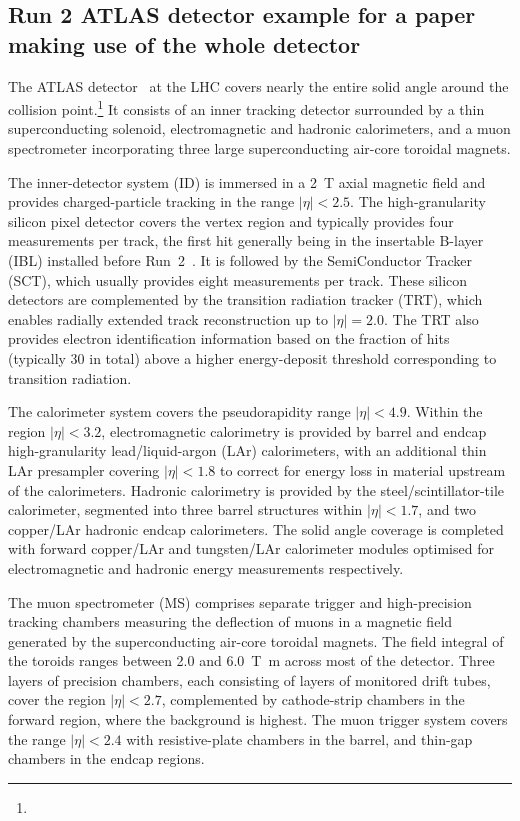 \subsection{Run 2 ATLAS detector example for a paper making use of the whole detector}
\label{sec:atlas2b}

The ATLAS detector~\cite{PERF-2007-01} at the LHC covers nearly the entire solid angle around the collision point.\footnote{\AtlasCoordFootnote}
It consists of an inner tracking detector surrounded by a thin superconducting solenoid, electromagnetic and hadronic calorimeters,
and a muon spectrometer incorporating three large superconducting air-core toroidal magnets.

The inner-detector system (ID) is immersed in a \qty{2}{\tesla} axial magnetic field 
and provides charged-particle tracking in the range \(|\eta| < 2.5\).
The high-granularity silicon pixel detector covers the vertex region and typically provides four measurements per track, 
the first hit generally being in the insertable B-layer (IBL) installed before Run~2~\cite{ATLAS-TDR-19,PIX-2018-001}.
It is followed by the SemiConductor Tracker (SCT), which usually provides eight measurements per track.
These silicon detectors are complemented by the transition radiation tracker (TRT),
which enables radially extended track reconstruction up to \(|\eta| = 2.0\). 
The TRT also provides electron identification information 
based on the fraction of hits (typically 30 in total) above a higher energy-deposit threshold corresponding to transition radiation.

The calorimeter system covers the pseudorapidity range \(|\eta| < 4.9\).
Within the region \(|\eta|< 3.2\), electromagnetic calorimetry is provided by barrel and 
endcap high-granularity lead/liquid-argon (LAr) calorimeters,
with an additional thin LAr presampler covering \(|\eta| < 1.8\)
to correct for energy loss in material upstream of the calorimeters.
Hadronic calorimetry is provided by the steel/scintillator-tile calorimeter,
segmented into three barrel structures within \(|\eta| < 1.7\), and two copper/LAr hadronic endcap calorimeters.
The solid angle coverage is completed with forward copper/LAr and tungsten/LAr calorimeter modules
optimised for electromagnetic and hadronic energy measurements respectively.

The muon spectrometer (MS) comprises separate trigger and
high-precision tracking chambers measuring the deflection of muons in a magnetic field generated by the superconducting air-core toroidal magnets.
The field integral of the toroids ranges between \num{2.0} and \qty{6.0}{\tesla\metre}
across most of the detector. 
Three layers of precision chambers, each consisting of layers of monitored drift tubes, cover the region \(|\eta| < 2.7\),
complemented by cathode-strip chambers in the forward region, where the background is highest.
The muon trigger system covers the range \(|\eta| < 2.4\) with resistive-plate chambers in the barrel, and thin-gap chambers in the endcap regions.

